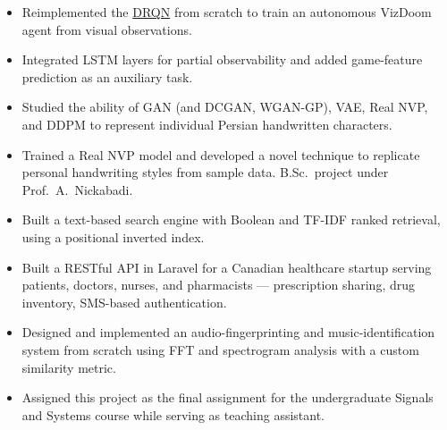 \documentclass[11pt,letterpaper]{article}
\begin{document}
\begin{itemize}
  \item Reimplemented the \href{https://arxiv.org/pdf/1609.05521}{DRQN} from scratch to train an autonomous VizDoom agent from visual observations.
  \item Integrated LSTM layers for partial observability and added game-feature prediction as an auxiliary task.
\end{itemize}

\begin{itemize}
  \item Studied the ability of GAN (and DCGAN, WGAN-GP), VAE, Real NVP, and DDPM to represent individual Persian handwritten characters.
  \item Trained a Real NVP model and developed a novel technique to replicate personal handwriting styles from sample data. B.Sc.\ project under Prof.\ A.\ Nickabadi.
\end{itemize}

\begin{itemize}
  \item Built a text-based search engine with Boolean and TF-IDF ranked retrieval, using a positional inverted index.
\end{itemize}

\begin{itemize}
  \item Built a RESTful API in Laravel for a Canadian healthcare startup serving patients, doctors, nurses, and pharmacists --- prescription sharing, drug inventory, SMS-based authentication.
\end{itemize}

\begin{itemize}
  \item Designed and implemented an audio-fingerprinting and music-identification system from scratch using FFT and spectrogram analysis with a custom similarity metric.
  \item Assigned this project as the final assignment for the undergraduate Signals and Systems course while serving as teaching assistant.
\end{itemize}
\end{document}
